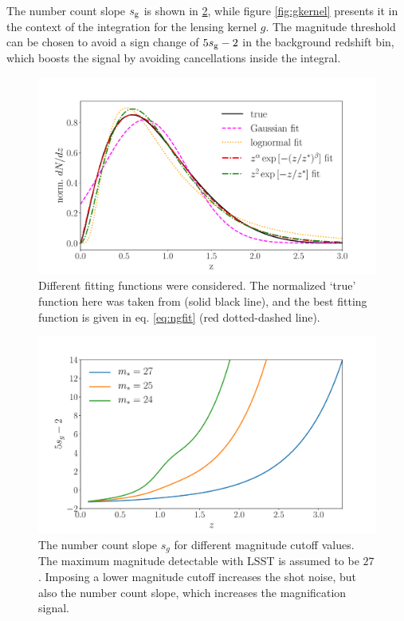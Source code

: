 \documentclass[useAMS,usenatbib]{mnras}
\begin{document}
 The number count slope $s_{\rm g}$ is shown in \ref{fig:sg}, while figure \ref{fig:gkernel} presents it in the context of the integration for the lensing kernel $g$. The magnitude threshold can be chosen to avoid a sign change of $5s_{\rm g} -2$ in the background redshift bin, which boosts the signal by avoiding cancellations inside the integral.

\begin{figure}
\centering\includegraphics[width=1.0\columnwidth]{GaussVSlognorm_fit_dndz.pdf}
\caption{Different fitting functions were considered. The normalized `true' function here was taken from \cite{0004-637X-814-2-145} (solid black line), and the best fitting function is given in eq. \ref{eq:ngfit} (red dotted-dashed line).}
\label{fig:ngfits}
\end{figure}


\begin{figure}
\centering\includegraphics[width=0.85\columnwidth]{alpha.pdf}
\caption{The number count slope $s_g$ for different magnitude cutoff values. The maximum magnitude detectable with LSST is assumed to be $27$. Imposing a lower magnitude cutoff increases the shot noise, but also the number count slope, which increases the magnification signal. }
\label{fig:sg}
\end{figure}
\end{document}
